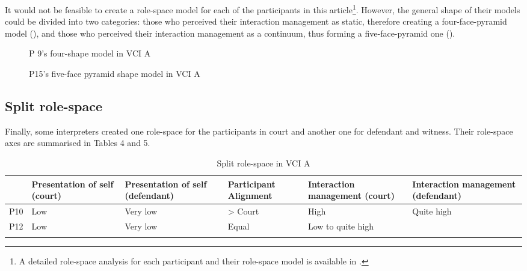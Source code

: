 \documentclass[output=paper]{langsci/langscibook}
\begin{document}
It would not be feasible to create a role-space model for each of the participants in this article\footnote{A detailed role-space analysis for each participant and their role-space model is available in \citet{Devaux2017b}.}. However, the general shape of their models could be divided into two categories: those who perceived their interaction management as static, therefore creating a four-face-pyramid model (), and those who perceived their interaction management as a continuum, thus forming a five-face-pyramid one ().  

  

 

\begin{figure}
\caption{P 9's four-shape model in VCI A}\label{fig:devaux:3}
\end{figure}

\begin{figure}
\caption{P15's five-face pyramid shape model in VCI A\label{fig:devaux:4}}
\end{figure}

\subsection{Split role-space}
Finally, some interpreters created one role-space for the participants in court and another one for defendant and witness. Their role-space axes are summarised in Tables 4 and 5. 

\begin{table}
\begin{tabularx}{\textwidth}{XXXXXX}
	\lsptoprule
& {Presentation of self (court)} & {Presentation of self (defendant)} & {Participant Alignment} & {Interaction management (court)} & {Interaction management (defendant)}\\\midrule
P10 & Low & Very low & > Court & High & Quite high\\
P12 & Low & Very low & Equal & \multicolumn{2}{X}{Low to quite high}\\
\lspbottomrule
\end{tabularx}
\caption{Split role-space in VCI A\label{tab:devaux:4}}
\end{table}
\end{document}
